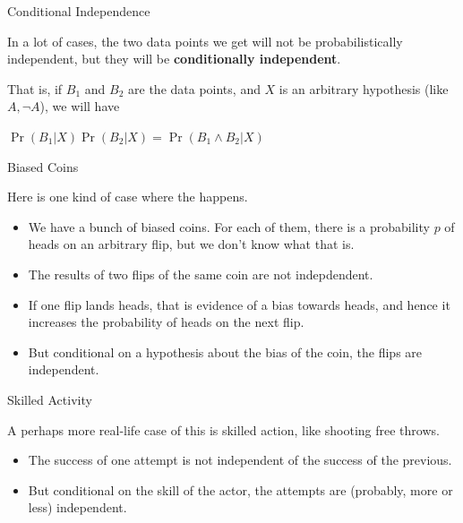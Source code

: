 \documentclass[
  ignorenonframetext,
]{beamer}
\providecommand{\tightlist}{%
  \setlength{\itemsep}{0pt}\setlength{\parskip}{0pt}}
\renewcommand{\,}{\text{, }}
\renewenvironment*{quote}	
	{\list{}{\rightmargin   \leftmargin} \item } 	
	{\endlist }
\begin{document}
\begin{frame}{Conditional Independence}
\protect\hypertarget{conditional-independence}{}

In a lot of cases, the two data points we get will not be
probabilistically independent, but they will be \textbf{conditionally
independent}.

That is, if \(B_1\) and \(B_2\) are the data points, and \(X\) is an
arbitrary hypothesis (like \(A, \neg A\)), we will have

\begin{quote}
\(\Pr(B_1 | X)\Pr(B_2 | X) = \Pr(B_1 \wedge B_2 | X)\)
\end{quote}

\end{frame}

\begin{frame}{Biased Coins}
\protect\hypertarget{biased-coins}{}

Here is one kind of case where the happens.

\begin{itemize}
\tightlist
\item
  We have a bunch of biased coins. For each of them, there is a
  probability \(p\) of heads on an arbitrary flip, but we don't know
  what that is. \pause
\item
  The results of two flips of the same coin are not indepdendent.
\item
  If one flip lands heads, that is evidence of a bias towards heads, and
  hence it increases the probability of heads on the next flip. \pause
\item
  But conditional on a hypothesis about the bias of the coin, the flips
  are independent.
\end{itemize}

\end{frame}

\begin{frame}{Skilled Activity}
\protect\hypertarget{skilled-activity}{}

A perhaps more real-life case of this is skilled action, like shooting
free throws.

\begin{itemize}
\tightlist
\item
  The success of one attempt is not independent of the success of the
  previous.
\item
  But conditional on the skill of the actor, the attempts are (probably,
  more or less) independent.
\end{itemize}

\end{frame}
\end{document}
